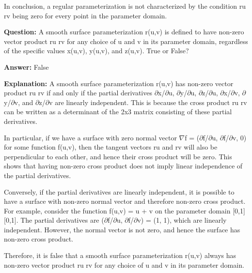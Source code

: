 \documentclass{article}
\begin{document}
In conclusion, a regular parameterization is not characterized by the condition ru {\texttimes} rv being zero for every point in the parameter domain.
                
                \vspace{0.5cm} 
        
            
                \textbf {Question:} A smooth surface parameterization r(u,v) is defined to have non-zero vector product ru {\texttimes} rv for any choice of u and v in its parameter domain, regardless of the specific values x(u,v), y(u,v), and z(u,v). True or False?
                
                \textbf{Answer:} False

                \textbf{Explanation:} A smooth surface parameterization r(u,v) has non-zero vector product ru {\texttimes} rv if and only if the partial derivatives \ensuremath{\partial}x/\ensuremath{\partial}u, \ensuremath{\partial}y/\ensuremath{\partial}u, \ensuremath{\partial}z/\ensuremath{\partial}u, \ensuremath{\partial}x/\ensuremath{\partial}v, \ensuremath{\partial}y/\ensuremath{\partial}v, and \ensuremath{\partial}z/\ensuremath{\partial}v are linearly independent. This is because the cross product ru {\texttimes} rv can be written as a determinant of the 2x3 matrix consisting of these partial derivatives.

In particular, if we have a surface with zero normal vector \ensuremath{\nabla}f = (\ensuremath{\partial}f/\ensuremath{\partial}u, \ensuremath{\partial}f/\ensuremath{\partial}v, 0) for some function f(u,v), then the tangent vectors ru and rv will also be perpendicular to each other, and hence their cross product will be zero. This shows that having non-zero cross product does not imply linear independence of the partial derivatives.

Conversely, if the partial derivatives are linearly independent, it is possible to have a surface with non-zero normal vector and therefore non-zero cross product. For example, consider the function f(u,v) = u + v on the parameter domain [0,1] {\texttimes} [0,1]. The partial derivatives are (\ensuremath{\partial}f/\ensuremath{\partial}u, \ensuremath{\partial}f/\ensuremath{\partial}v) = (1, 1), which are linearly independent. However, the normal vector is not zero, and hence the surface has non-zero cross product.

Therefore, it is false that a smooth surface parameterization r(u,v) always has non-zero vector product ru {\texttimes} rv for any choice of u and v in its parameter domain.
                
\end{document}

